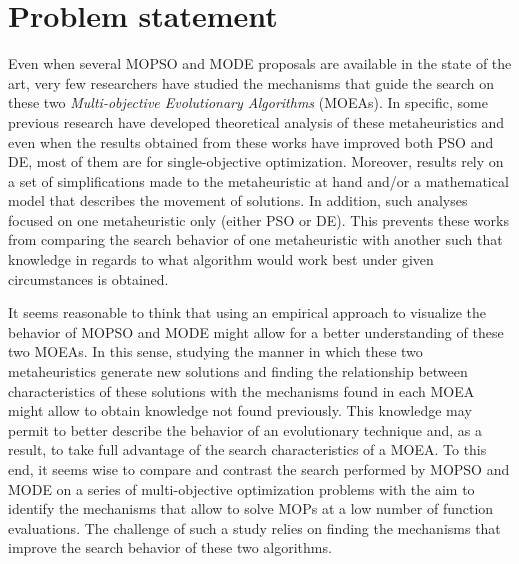 \section{Problem statement} \label{}

Even when several MOPSO and MODE proposals are available in the state of the art, very few researchers have studied the mechanisms that guide the search on these two \emph{Multi-objective Evolutionary Algorithms} (MOEAs). In specific, some previous research have developed theoretical analysis of these metaheuristics \cite{Vandenbergh2006,Clerc2002} and even when the results obtained from these works have improved both PSO and DE, most of them are for single-objective optimization. Moreover, results rely on a set of simplifications made to the metaheuristic at hand and/or a mathematical model that describes the movement of solutions. In addition, such analyses focused on one metaheuristic only (either PSO or DE). This prevents these works from comparing the search behavior of one metaheuristic with another such that knowledge in regards to what algorithm would work best under given circumstances is obtained. 

It seems reasonable to think that using an empirical approach to visualize the behavior of MOPSO and MODE might allow for a better understanding of these two MOEAs. In this sense, studying the manner in which these two metaheuristics generate new solutions and finding the relationship between characteristics of these solutions with the mechanisms found in each MOEA might allow to obtain knowledge not found previously. This knowledge may permit to better describe the behavior of an evolutionary technique and, as a result, to take full advantage of the search characteristics of a MOEA. To this end, it seems wise to compare and contrast the search performed by MOPSO and MODE on a series of multi-objective optimization problems with the aim to identify the mechanisms that allow to solve MOPs at a low number of function evaluations. The challenge of such a study relies on finding the mechanisms that improve the search behavior of these two algorithms.

